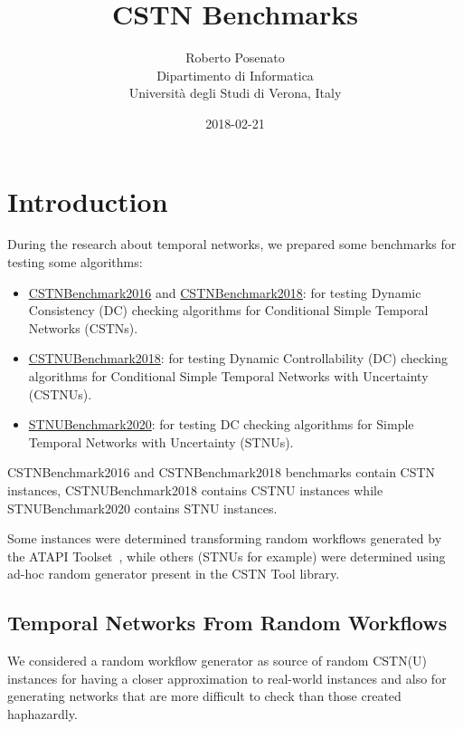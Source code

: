 \documentclass[a4paper,11pt]{article}
\begin{document}
\title{CSTN Benchmarks}
\author{Roberto Posenato\\
	Dipartimento di Informatica\\
	Università degli Studi di Verona, Italy}
\date{2018-02-21}

\ifpdf
\maketitle
\fi 

\section{Introduction}

During the research about temporal networks, we prepared some benchmarks for testing some algorithms:
\begin{itemize}
\item  \href{http://profs.scienze.univr.it/~posenato/software/benchmarks/CSTNBenchmark2016.tgz}{CSTNBenchmark2016} and \href{http://profs.scienze.univr.it/~posenato/software/benchmarks/CSTNBenchmark2018.tgz}{CSTNBenchmark2018}: for testing Dynamic Consistency (DC) checking algorithms for Conditional Simple Temporal Networks (CSTNs).

\item  \href{http://profs.scienze.univr.it/~posenato/software/benchmarks/CSTNUBenchmark2018.tgz}{CSTNUBenchmark2018}: for testing Dynamic Controllability (DC) checking algorithms for Conditional Simple Temporal Networks with Uncertainty (CSTNUs).

\item \href{https://profs.scienze.univr.it/~posenato/software/benchmarks/STNUBenchmark2020.tgz}{STNUBenchmark2020}: for testing DC checking algorithms for Simple Temporal Networks with Uncertainty (STNUs).
\end{itemize} 

CSTNBenchmark2016 and CSTNBenchmark2018 benchmarks contain CSTN instances, CSTNUBenchmark2018 contains CSTNU instances while STNUBenchmark2020 contains STNU instances.

Some instances were determined transforming random workflows generated by the ATAPI Toolset~\cite{LanzR14}, while others (STNUs for example) were determined using ad-hoc random generator present in the CSTN Tool library.


\subsection{Temporal Networks From Random Workflows}
We considered a random workflow generator as source of random CSTN(U) instances for having a closer approximation to real-world instances and also for generating networks that are more difficult to check than those created haphazardly.
\end{document}
